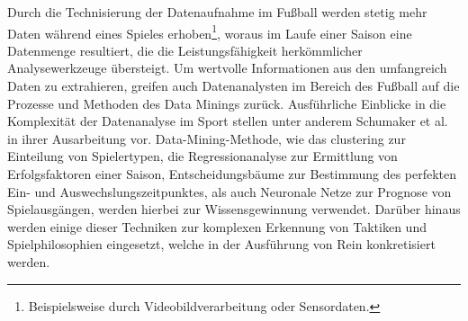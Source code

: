 Durch die Technisierung der Datenaufnahme im Fußball werden stetig mehr Daten während eines Spieles erhoben\footnote{Beispielsweise durch Videobildverarbeitung oder Sensordaten.}, woraus im Laufe einer Saison eine Datenmenge resultiert, die die Leistungsfähigkeit herkömmlicher Analysewerkzeuge übersteigt. Um wertvolle Informationen aus den umfangreich Daten zu extrahieren, greifen auch Datenanalysten im Bereich des Fußball auf die Prozesse und Methoden des Data Minings zurück. Ausführliche Einblicke in die Komplexität der Datenanalyse im Sport stellen unter anderem Schumaker et al. in ihrer Ausarbeitung vor. Data-Mining-Methode, wie das \gls{clustering} zur Einteilung von Spielertypen, die Regressionanalyse zur Ermittlung von Erfolgsfaktoren einer Saison, Entscheidungsbäume zur Bestimmung des perfekten Ein- und Auswechslungszeitpunktes, als auch Neuronale Netze zur Prognose von Spielausgängen, werden hierbei zur Wissensgewinnung verwendet. Darüber hinaus werden einige dieser Techniken zur komplexen Erkennung von Taktiken und Spielphilosophien eingesetzt, welche in der Ausführung von Rein konkretisiert werden.



